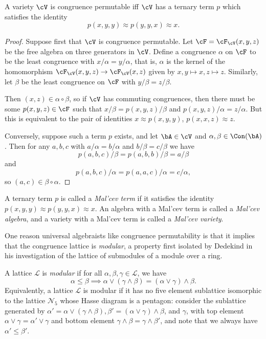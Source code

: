 \begin{thm} A variety $\cV$ is congruence permutable iff $\cV$ has a ternary term $p$ which satisfies the identity
\[
p(x,y,y) \approx p(y,y,x) \approx x.
\]
\end{thm}
\begin{proof} Suppose first that $\cV$ is congruence permutable. Let $\cF = \cF_\cV(x,y,z)$ be the free algebra on three generators in $\cV$. Define a congruence $\alpha$ on $\cF$ to be the least congruence with $x/\alpha = y/\alpha$, that is, $\alpha$ is the kernel of the homomorphism $\cF_\cV(x,y,z) \rightarrow \cF_\cV(x,z)$ given by $x,y \mapsto x, z \mapsto z$. Similarly, let $\beta$ be the least congruence on $\cF$ with $y/\beta = z/\beta$.

Then $(x,z) \in \alpha \circ \beta$, so if $\cV$ has commuting congruences, then there must be some $p(x,y,z) \in \cF$ such that $x/\beta = p(x,y,z)/\beta$ and $p(x,y,z)/\alpha = z/\alpha$. But this is equivalent to the pair of identities $x \approx p(x,y,y)$, $p(x,x,z) \approx z$.

Conversely, suppose such a term $p$ exists, and let $\bA \in \cV$ and $\alpha, \beta \in \Con(\bA)$. Then for any $a,b,c$ with $a/\alpha = b/\alpha$ and $b/\beta = c/\beta$ we have
\[
p(a,b,c)/\beta = p(a,b,b)/\beta = a/\beta
\]
and
\[
p(a,b,c)/\alpha = p(a,a,c)/\alpha = c/\alpha,
\]
so $(a,c) \in \beta\circ\alpha$.
\end{proof}

\begin{defn} A ternary term $p$ is called a \emph{Mal'cev term} if it satisfies the identity $p(x,y,y) \approx p(y,y,x) \approx x$. An algebra with a Mal'cev term is called a \emph{Mal'cev algebra}, and a variety with a Mal'cev term is called a \emph{Mal'cev variety}.
\end{defn}

One reason universal algebraists like congruence permutability is that it implies that the congruence lattice is \emph{modular}, a property first isolated by Dedekind in his investigation of the lattice of submodules of a module over a ring.

\begin{defn}\label{modular-defn} A lattice $\mathcal{L}$ is \emph{modular} if for all $\alpha, \beta, \gamma \in \mathcal{L}$, we have
\[
\alpha \le \beta \implies \alpha \vee (\gamma \wedge \beta) = (\alpha \vee \gamma) \wedge \beta.
\]
Equivalently, a lattice $\mathcal{L}$ is modular if it has no five element sublattice isomorphic to the lattice $\mathcal{N}_5$ whose Hasse diagram is a pentagon: consider the sublattice generated by $\alpha' = \alpha \vee (\gamma \wedge \beta), \beta' = (\alpha \vee \gamma) \wedge \beta$, and $\gamma$, with top element $\alpha \vee \gamma = \alpha' \vee \gamma$ and bottom element $\gamma \wedge \beta = \gamma \wedge \beta'$, and note that we always have $\alpha' \le \beta'$.
\end{defn}

